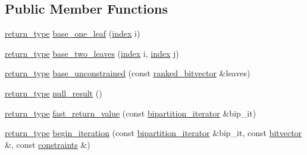 \subsection*{Public Member Functions}
\begin{DoxyCompactItemize}
\item 
\hyperlink{classterraces_1_1variants_1_1multitree__callback_a31341dbe798daa06859cd3e0ab354bf1}{return\+\_\+type} \hyperlink{classterraces_1_1variants_1_1multitree__callback_ae91d72a91413b048a2cc8cbe58732bdf}{base\+\_\+one\+\_\+leaf} (\hyperlink{namespaceterraces_adbc33ccb543d1634e96d0eb02e472c77}{index} i)
\item 
\hyperlink{classterraces_1_1variants_1_1multitree__callback_a31341dbe798daa06859cd3e0ab354bf1}{return\+\_\+type} \hyperlink{classterraces_1_1variants_1_1multitree__callback_ab6cabd831c1154159acaeb0ba8e96302}{base\+\_\+two\+\_\+leaves} (\hyperlink{namespaceterraces_adbc33ccb543d1634e96d0eb02e472c77}{index} i, \hyperlink{namespaceterraces_adbc33ccb543d1634e96d0eb02e472c77}{index} j)
\item 
\hyperlink{classterraces_1_1variants_1_1multitree__callback_a31341dbe798daa06859cd3e0ab354bf1}{return\+\_\+type} \hyperlink{classterraces_1_1variants_1_1multitree__callback_a4cc94019b17d106020ddc5530f85a93f}{base\+\_\+unconstrained} (const \hyperlink{namespaceterraces_acc45ec9c561024c50ecbce5b6738ba08}{ranked\+\_\+bitvector} \&leaves)
\item 
\hyperlink{classterraces_1_1variants_1_1multitree__callback_a31341dbe798daa06859cd3e0ab354bf1}{return\+\_\+type} \hyperlink{classterraces_1_1variants_1_1multitree__callback_a504be6c2590bdcc5b40a12e00a4889c3}{null\+\_\+result} ()
\item 
\hyperlink{classterraces_1_1variants_1_1multitree__callback_a31341dbe798daa06859cd3e0ab354bf1}{return\+\_\+type} \hyperlink{classterraces_1_1variants_1_1multitree__callback_a8fb6fab8ddad07bfdd92dd832a8bf917}{fast\+\_\+return\+\_\+value} (const \hyperlink{classterraces_1_1bipartition__iterator}{bipartition\+\_\+iterator} \&bip\+\_\+it)
\item 
\hyperlink{classterraces_1_1variants_1_1multitree__callback_a31341dbe798daa06859cd3e0ab354bf1}{return\+\_\+type} \hyperlink{classterraces_1_1variants_1_1multitree__callback_a8376df6caa4ecafab1003f84e5d19c5d}{begin\+\_\+iteration} (const \hyperlink{classterraces_1_1bipartition__iterator}{bipartition\+\_\+iterator} \&bip\+\_\+it, const \hyperlink{namespaceterraces_a1b526fb554dff829f7ad51eb21d5ed06}{bitvector} \&, const \hyperlink{namespaceterraces_a6f603ffd30ed4d902fce6424492e0581}{constraints} \&)

\end{DoxyCompactItemize}
